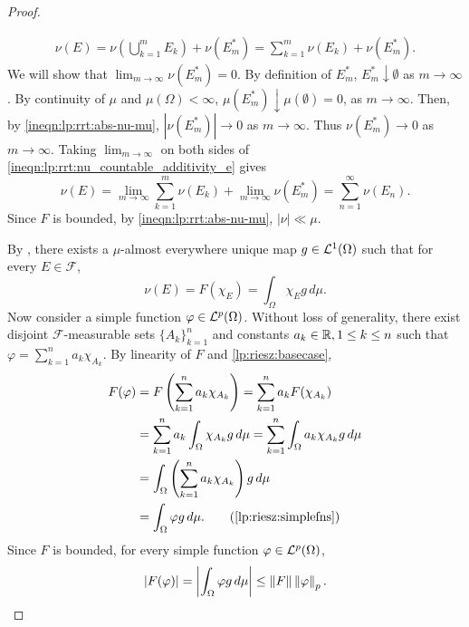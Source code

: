 \begin{proof}
\begin{step}[$\mu(\Omega) < \infty$]
\begin{align}
    \label{ineqn:lp:rrt:nu_countable_additivity_e}
    \nu (E) = \nu \left (\bigcup_{k = 1}^m E_k \right) + \nu ( E_{m}^\ast) = \sum_{k=1}^m \nu(E_k) + \nu( E_{m}^\ast).
\end{align}
We will show that $\lim_{m \to \infty} \nu (E_{m}^\ast) = 0$. By definition of $E_{m}^\ast$, $E_{m}^\ast \downarrow \emptyset$ as $m \to \infty$. By continuity of $\mu$ and $\mu(\Omega) < \infty$, $\mu (E_{m}^\ast) \downarrow \mu (\emptyset) = 0$, as $m \to \infty$. Then, by \ref{ineqn:lp:rrt:abs-nu-mu}, $|\nu (E_{m}^\ast) | \to 0$ as $m \to \infty$. Thus $\nu (E_{m}^\ast)  \to 0$ as $m \to \infty$. Taking $\lim_{m  \to \infty}$ on both sides of \ref{ineqn:lp:rrt:nu_countable_additivity_e} gives \[ 
    \nu(E) = \lim_{m \to \infty} \sum_{k=1}^m \nu(E_k) + \lim_{m \to \infty}\nu (E_{m}^\ast)= \sum_{n = 1}^\infty \nu(E_n).
\]
Since $F$ is bounded, by \ref{ineqn:lp:rrt:abs-nu-mu}, $|\nu | \ll \mu$. 
\end{step}
By , there exists a $\mu$-almost everywhere unique map $g \in {\mathcal {L}^1} (\Omega)$ such that for every $E \in \mathcal{F}$,
\begin{equation}
    \label{lp:riesz:basecase}
    \nu(E) = F (\chi_E) = \int_\Omega \chi_E g \,d\mu.
\end{equation}
Now consider a simple function $\varphi \in {\mathcal {L}^p}(\Omega)$. Without loss of generality, there exist disjoint $\mathcal{F}$-measurable sets $\{ A_k \}_{k=1}^n$ and constants $a_k \in {\mathbb R}, 1 \leq k \leq n$ such that $\varphi = \sum_{k = 1}^n a_k \chi_{A_k}$. By linearity of $F$ and \ref{lp:riesz:basecase},
\begin{subequations}\label{lp:riesz:simplefns}
\begin{align*}
    F (\varphi) &= F \left (\sum_{k = 1}^n a_k \chi_{A_k} \right ) = \sum_{k = 1}^n a_k F(\chi_{A_k}) \\
                &= \sum_{k = 1}^n a_k \int_\Omega \chi_{A_k} g \,d\mu = \sum_{k = 1}^n \int_\Omega a_k \chi_{A_k} g \,d\mu \\ 
                &= \int_\Omega \left(\sum_{k = 1}^n a_k \chi_{A_k} \right) g \,d\mu \\ 
                &= \int_\Omega \varphi g \,d\mu.
     \tag{\ref{lp:riesz:simplefns}} 
\end{align*}
\end{subequations}
Since $F$ is bounded, for every simple function $\varphi \in {\mathcal {L}^p}(\Omega)$, \begin{align}
    \label{lp:ineqn:bound_boundedfns}
    | F (\varphi) | = \left | \int_\Omega \varphi g \,d\mu  \right | \leq \left\lVert F\right\rVert \left\lVert\varphi\right\rVert_p.
\end{align}


\end{proof}
